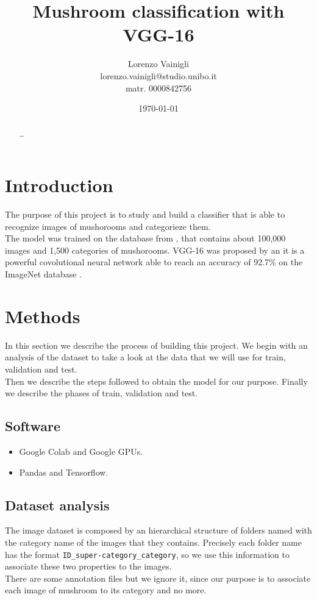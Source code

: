 \documentclass[12pt]{llncs}
\title{Mushroom classification with VGG-16}
\author{Lorenzo Vainigli \\
lorenzo.vainigli@studio.unibo.it \\
matr. 0000842756}
\institute{Course of Machine Learning \\
Laurea Magistrale in Informatica \\
University of Bologna \\
A.Y. 2020-2021}
\date{\today}
\begin{document}
{\def\addcontentsline#1#2#3{}\maketitle}

\begin{abstract}
\ldots
\end{abstract}

\begingroup
\let\clearpage\relax
\renewcommand{\contentsname}{}
\setcounter{tocdepth}{2}
\tableofcontents
\endgroup

\section{Introduction}
The purpose of this project is to study and build a classifier that is able to recognize images of mushorooms and categorieze them.\\
The model was trained on the database from \cite{fgvc}, that contains about 100,000 images and 1,500 categories of mushorooms.
VGG-16 was proposed by \cite{simonyan} an it is a powerful covolutional neural network able to reach an accuracy of 92.7\% on the ImageNet database \cite{deng}.

\section{Methods}
In this section we describe the process of building this project. We begin with an analysis of the dataset to take a look at the data that we will use for train, validation and test. \\
Then we describe the steps followed to obtain the model for our purpose. Finally we describe the phases of train, validation and test.

\subsection{Software}
\begin{itemize}
\item Google Colab and Google GPUs.
\item Pandas and Tensorflow.
\end{itemize}

\subsection{Dataset analysis}
The image dataset is composed by an hierarchical structure of folders named with the category name of the images that they contains. Precisely each folder name has the format \texttt{ID\_super-category\_category}, so we use this information to associate these two properties to the images. \\
There are some annotation files but we ignore it, since our purpose is to associate each image of mushroom to its category and no more.
\end{document}
